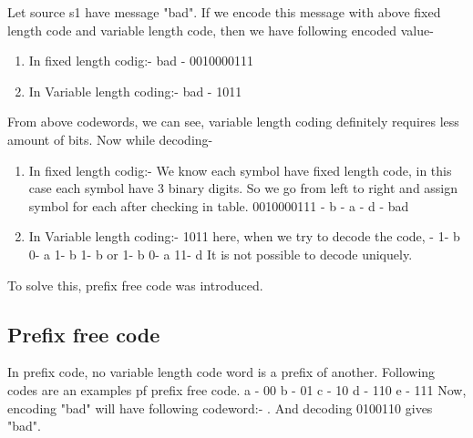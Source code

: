 \documentclass[10pt,a4paper]{article}
\begin{document}
     Let source s1 have message "bad". If we encode this message with above fixed length code and variable length code, then we have following encoded value-
     \begin{enumerate}
     	\item In fixed length codig:- 
     	bad - 0010000111
     	\item In Variable length coding:-
     	bad - 1011
     \end{enumerate}
     From above codewords, we can see, variable length coding definitely requires less amount of bits. Now while decoding- 
     \begin{enumerate}
     	\item In fixed length codig:- We know each symbol have fixed length code, in this case each symbol have 3 binary digits. So we go from left to right and assign symbol for each after checking in table. 
     	0010000111 - b  - a  - d  - bad \newline
     	\item In Variable length coding:-
     	1011\newline 
     	here, when we try to decode the code,  - 
     	1- b
     	0- a 
     	1- b 
     	1- b  
     	\newline or
     	1- b
     	0- a 
     	11- d  \newline
     	It is not possible to decode uniquely.     	
     \end{enumerate}
 
 To solve this, prefix free code was introduced. 
 \subsection*{Prefix free code}
 In prefix code, no variable length code word is a prefix of another. Following codes are an examples pf prefix free code. 
 \newline
 a - 00\newline
 b - 01\newline
 c - 10\newline
 d - 110\newline
 e - 111\newline
 Now, encoding "bad" will have following codeword:- . And decoding 0100110 gives "bad".
 
\end{document}
